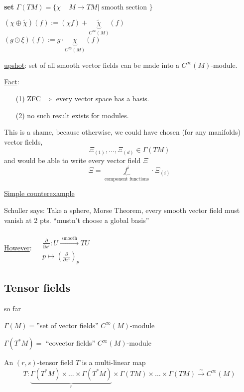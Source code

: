 \textbf{set} $\Gamma(TM) = \lbrace \chi \quad \, M \to TM | \text{ smooth section } \rbrace$
 
$(\chi \oplus \widetilde{\chi})(f) := (\chi f) + \underbrace{\widetilde{\chi}}_{C^{\infty}(M)}(f)$ \\

$(g\odot \xi)(f) := g \cdot \underbrace{ \chi }_{C^{\infty}(M)}(f)$


\underline{upshot}: set of all smooth vector fields can be made into a $C^{\infty}(M)$-module.  

\underline{Fact}: \begin{enumerate}
\item[(1)] ZF\underline{C} $\Longrightarrow $ every vector space has a basis. 
\item[(2)] no such result exists for modules.  
\end{enumerate}

This is a shame, because otherwise, we could have chosen (for any manifolds) vector fields, 
\[
\Xi_{(1)}, \dots , \Xi_{(d)} \in \Gamma(TM)
\]
and would be able to write every vector field $\Xi$
\[
\Xi = \underbrace{ f^i }_{\text{ component functions } } \cdot \Xi_{(i)}
\]

\underline{Simple counterexample}

Schuller says: Take a sphere, Morse Theorem, every smooth vector field must vanish at 2 pts. ``mustn't choose a global basis''


\underline{However}: $\begin{aligned} & \quad \\
  & \frac{ \partial }{ \partial x^i} : U \xrightarrow{ \text{ smooth }} TU \\
  & p \mapsto \left( \frac{ \partial }{ \partial x^i } \right)_p
\end{aligned}$

\subsection{Tensor fields}

so far

$\Gamma(M) = $''set of vector fields''  $C^{\infty}(M)$-module

 $\Gamma(T^*M) = $ ``covector fields'' $C^{\infty}(M)$-module

\begin{definition}
An $(r,s)$-tensor field $T$ is a multi-linear map
\[
T:\underbrace{ \Gamma(T^*M) \times \dots \times \Gamma(T^*M) }_{r} \times \Gamma(TM) \times \dots \times \Gamma(TM) \xrightarrow{ \sim } C^{\infty}(M)
\]
\end{definition}


